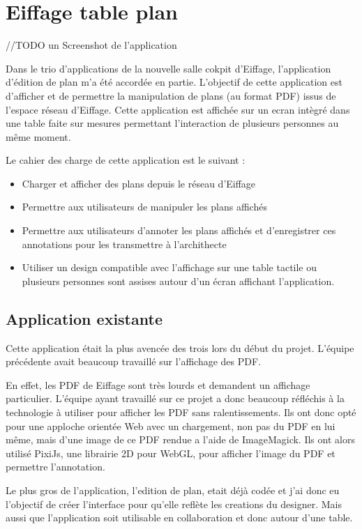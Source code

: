 \section{Eiffage table plan}
\label{eiffageTablePlan}

//TODO un Screenshot de l'application

Dans le trio d'applications de la nouvelle salle cokpit d'Eiffage, l'application d'édition de plan m'a été accordée en partie.
L'objectif de cette application est d'afficher et de permettre la manipulation de plans (au format PDF) issus de  l'espace réseau d'Eiffage.
Cette application est affichée sur un ecran intègré dans une table faite sur mesures permettant l'interaction de plusieurs personnes au même moment.

Le cahier des charge de cette application est le suivant :
\begin{itemize}
    \item Charger et afficher des plans depuis le réseau d'Eiffage
    \item Permettre aux utilisateurs de manipuler les plans affichés
    \item Permettre aux utilisateurs d'annoter les plans affichés et d'enregistrer ces annotations pour les transmettre à l'archithecte
    \item Utiliser un design compatible avec l'affichage sur une table tactile ou plusieurs personnes sont assises autour d'un écran affichant l'application.
\end{itemize}

\subsection{Application existante}
\label{eiffageTablePlanApplicationExistante}

Cette application était la plus avencée des trois lors du début du projet.
L'équipe précédente avait beaucoup travaillé sur l'affichage des PDF.

En effet, les PDF de Eiffage sont très lourds et demandent un affichage particulier.
L'équipe ayant travaillé sur ce projet a donc beaucoup réfléchis à la technologie à utiliser pour afficher les PDF sans ralentissements.
Ils ont donc opté pour une apploche orientée Web avec un chargement, non pas du PDF en lui même, mais d'une image de ce PDF rendue a l'aide de ImageMagick.
Ils ont alors utilisé PixiJs, une librairie 2D pour WebGL, pour afficher l'image du PDF et permettre l'annotation.

Le plus gros de l'application, l'edition de plan, etait déjà codée et j'ai donc eu l'objectif de créer l'interface pour qu'elle reflète les creations du designer.
Mais aussi que l'application soit utilisable en collaboration et donc autour d'une table.

